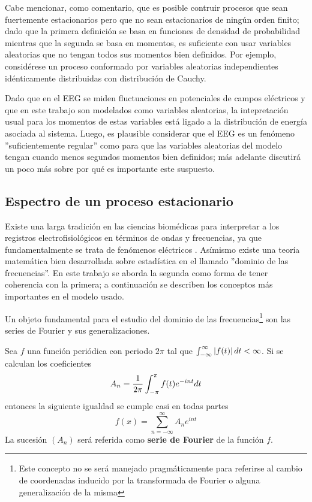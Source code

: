 Cabe mencionar, como comentario, que es posible contruir procesos que sean fuertemente
estacionarios pero que no sean estacionarios de ning\'un orden finito; dado que
la primera definici\'on se basa en funciones de densidad de probabilidad mientras que la segunda
se basa en momentos, es suficiente con usar variables aleatorias que no tengan todos
sus momentos bien definidos. Por ejemplo, consid\'erese un proceso conformado por variables
aleatorias independientes id\'enticamente distribuidas con distribuci\'on de Cauchy.

Dado que en el EEG se miden fluctuaciones en potenciales de campos el\'ectricos
y que en este trabajo son modelados como variables aleatorias, 
la intepretaci\'on usual para los momentos de estas variables est\'a ligado a la distribuci\'on de
energ\'ia asociada al sistema. Luego, es plausible considerar que el EEG es un fen\'omeno
''suficientemente regular'' como para que las variables aleatorias del modelo tengan cuando
menos segundos momentos bien definidos; m\'as adelante discutir\'a un poco m\'as sobre por
qu\'e es importante este suspuesto.


\subsection{Espectro de un proceso estacionario}

Existe una larga tradici\'on en las ciencias biom\'edicas para interpretar a los registros
electrofisiol\'ogicos en t\'erminos de ondas y frecuencias, ya que fundamentalmente se
trata de fen\'omenos el\'ectricos \cite{Kaiser00}. 
As\'imismo existe una teor\'ia matem\'atica bien desarrollada sobre estad\'istica en el 
llamado ''dominio de las frecuencias''. 
En este trabajo se aborda la segunda como forma de tener coherencia con la primera; a continuaci\'on
se describen los conceptos m\'as importantes en el modelo usado.

Un objeto fundamental para el estudio del dominio de las frecuencias\footnote{Este concepto 
no se
ser\'a manejado pragm\'aticamente para referirse
al cambio de coordenadas inducido por la transformada de Fourier o alguna generalizaci\'on de la 
misma} son las series de Fourier y sus generalizaciones. 

\begin{defn}
Sea $f$ una funci\'on peri\'odica con periodo $2\pi$ tal que $\int_{-\infty}^{\infty} \left| f(t) \right| dt < \infty$. 
Si se calculan los coeficientes
\begin{equation*}
A_n = \frac{1}{2\pi} \int_{-\pi}^{\pi} f(t) e^{- i n t} dt
\end{equation*}
entonces la siguiente igualdad se cumple casi en todas partes
\begin{equation*}
f(x) = \sum_{n=-\infty}^{\infty} A_n e^{i n t}
\end{equation*}
La sucesi\'on $\left( A_n \right)$ ser\'a referida como \textbf{serie de Fourier} de la funci\'on
$f$.
\label{FourierClasico}
\end{defn}

